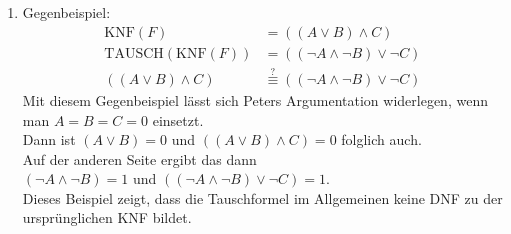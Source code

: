 \documentclass[a4paper,10pt]{scrartcl}
\begin{document}
\begin{enumerate}
\begin{enumerate}[1.]
 \item
 Gegenbeispiel:
 \begin{align*}
  \text{KNF}(F) &= ((A\vee B)\wedge C)\\
  \text{TAUSCH}(\text{KNF}(F)) &= ((\neg A\wedge\neg B)\vee\neg C)\\
  ((A\vee B)\wedge C) &\stackrel{?}{\equiv} ((\neg A\wedge\neg B)\vee\neg C)
 \end{align*}
 Mit diesem Gegenbeispiel lässt sich Peters Argumentation widerlegen, wenn man
 $A=B=C=0$ einsetzt.\\
 Dann ist $(A\vee B)=0$ und $((A\vee B)\wedge C)=0$ folglich auch.\\
 Auf der anderen Seite ergibt das dann \\
 $(\neg A\wedge\neg B)=1$ und $((\neg A\wedge\neg B)\vee\neg C)=1$.\\
 Dieses Beispiel zeigt, dass die Tauschformel im Allgemeinen keine DNF zu der ursprünglichen KNF bildet.


\end{enumerate}

\end{enumerate}
\end{document}
